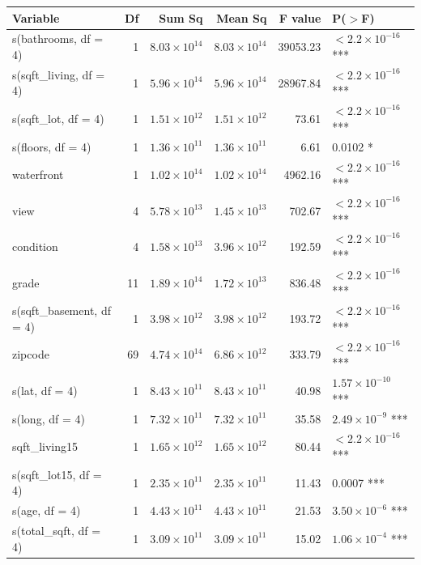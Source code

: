 \documentclass[a4paper, 11pt]{article}
\begin{document}
\begin{table}[ht]
\centering
\begin{tabular}{|l|r|r|r|r|l|}
\hline
\textbf{Variable} & \textbf{Df} & \textbf{Sum Sq} & \textbf{Mean Sq} & \textbf{F value} & \textbf{P($>$F)} \\
\hline
s(bathrooms, df = 4) & 1 & $8.03 \times 10^{14}$ & $8.03 \times 10^{14}$ & 39053.23 & $< 2.2 \times 10^{-16}$ *** \\
s(sqft\_living, df = 4) & 1 & $5.96 \times 10^{14}$ & $5.96 \times 10^{14}$ & 28967.84 & $< 2.2 \times 10^{-16}$ *** \\
s(sqft\_lot, df = 4) & 1 & $1.51 \times 10^{12}$ & $1.51 \times 10^{12}$ & 73.61 & $< 2.2 \times 10^{-16}$ *** \\
s(floors, df = 4) & 1 & $1.36 \times 10^{11}$ & $1.36 \times 10^{11}$ & 6.61 & 0.0102 * \\
waterfront & 1 & $1.02 \times 10^{14}$ & $1.02 \times 10^{14}$ & 4962.16 & $< 2.2 \times 10^{-16}$ *** \\
view & 4 & $5.78 \times 10^{13}$ & $1.45 \times 10^{13}$ & 702.67 & $< 2.2 \times 10^{-16}$ *** \\
condition & 4 & $1.58 \times 10^{13}$ & $3.96 \times 10^{12}$ & 192.59 & $< 2.2 \times 10^{-16}$ *** \\
grade & 11 & $1.89 \times 10^{14}$ & $1.72 \times 10^{13}$ & 836.48 & $< 2.2 \times 10^{-16}$ *** \\
s(sqft\_basement, df = 4) & 1 & $3.98 \times 10^{12}$ & $3.98 \times 10^{12}$ & 193.72 & $< 2.2 \times 10^{-16}$ *** \\
zipcode & 69 & $4.74 \times 10^{14}$ & $6.86 \times 10^{12}$ & 333.79 & $< 2.2 \times 10^{-16}$ *** \\
s(lat, df = 4) & 1 & $8.43 \times 10^{11}$ & $8.43 \times 10^{11}$ & 40.98 & $1.57 \times 10^{-10}$ *** \\
s(long, df = 4) & 1 & $7.32 \times 10^{11}$ & $7.32 \times 10^{11}$ & 35.58 & $2.49 \times 10^{-9}$ *** \\
sqft\_living15 & 1 & $1.65 \times 10^{12}$ & $1.65 \times 10^{12}$ & 80.44 & $< 2.2 \times 10^{-16}$ *** \\
s(sqft\_lot15, df = 4) & 1 & $2.35 \times 10^{11}$ & $2.35 \times 10^{11}$ & 11.43 & 0.0007 *** \\
s(age, df = 4) & 1 & $4.43 \times 10^{11}$ & $4.43 \times 10^{11}$ & 21.53 & $3.50 \times 10^{-6}$ *** \\
s(total\_sqft, df = 4) & 1 & $3.09 \times 10^{11}$ & $3.09 \times 10^{11}$ & 15.02 & $1.06 \times 10^{-4}$ *** \\

\end{tabular}
\end{table}
\end{document}
